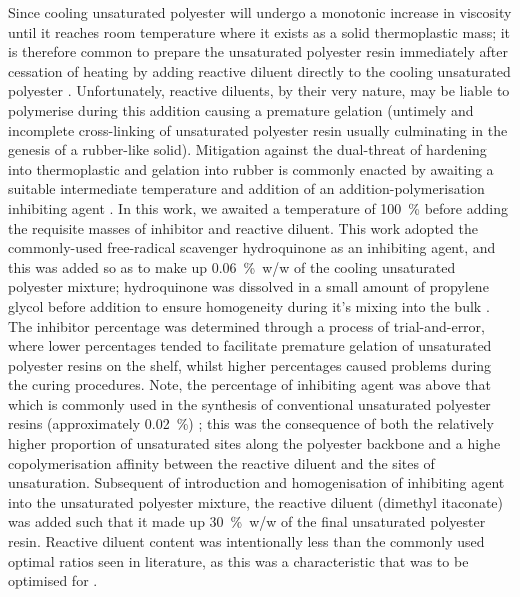 Since cooling unsaturated polyester will undergo a monotonic increase in
 viscosity until it reaches room temperature where it exists as a
 solid thermoplastic mass; it is therefore common to prepare the unsaturated
 polyester resin immediately after cessation of heating by adding
 reactive diluent directly to the cooling unsaturated polyester
 \cite{Parkyn1967}.
Unfortunately, reactive diluents, by their very nature, may be liable to
 polymerise during this addition causing a premature gelation (untimely
 and incomplete cross-linking of unsaturated polyester resin usually
 culminating in the genesis of a rubber-like solid).
Mitigation against the dual-threat of hardening into thermoplastic and
 gelation into rubber is commonly enacted by awaiting a suitable intermediate
 temperature and addition of an addition-polymerisation inhibiting agent
 \cite{Parkyn1967,Ahamad2001,Cherian2004}.
In this work, we awaited a temperature of 100~\unit{\percent} before adding
 the requisite masses of inhibitor and reactive diluent.
This work adopted the commonly-used free-radical scavenger hydroquinone
 as an inhibiting agent, and this was added so as to make up
 0.06~\unit{\percent}~w/w of the cooling unsaturated polyester mixture;
 hydroquinone was dissolved in a small amount of propylene glycol before
 addition to ensure homogeneity during it's mixing into the bulk
 \cite{Parkyn1967}.
The inhibitor percentage was determined through a process of
 trial-and-error, where lower percentages tended to facilitate premature
 gelation of unsaturated polyester resins on the shelf, whilst higher
 percentages caused problems during the curing procedures.
Note, the percentage of inhibiting agent was above that which is
 commonly used in the synthesis of conventional unsaturated polyester
 resins (approximately 0.02~\unit{\percent}) \cite{Parkyn1967,Cherian2004};
 this was the consequence of both the relatively higher proportion of
 unsaturated sites along the polyester backbone and a highe copolymerisation
 affinity between the reactive diluent and the sites of unsaturation.
Subsequent of introduction and homogenisation of inhibiting agent into
 the unsaturated polyester mixture, the reactive diluent (dimethyl itaconate)
 was added such that it made up 30~\unit{\percent}~w/w of the final
 unsaturated polyester resin.
Reactive diluent content was intentionally less than the commonly used
 optimal ratios seen in literature, as this was a characteristic that was
 to be optimised for \cite{Parkyn1967,Ahamad2001,Cherian2004,Bodnar1990}.

